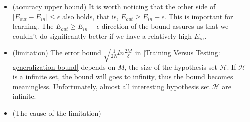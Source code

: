 \begin{itemize}[noitemsep, topsep=0pt]
    \item (accuracy upper bound) It is worth noticing that the other side of $|E_{out} - E_{in}| \le \epsilon$ also holds,
        that is, $E_{out} \ge E_{in} - \epsilon$.
        This is important for learning. 
        The $E_{out} \ge E_{in} - \epsilon$ direction of the bound assures us that we couldn't do significantly better
        if we have a relatively high $E_{in}$.
    \item (limitation) The error bound $\sqrt{\frac{1}{2N} ln \frac{2M}{\delta}}$ in \ref{Training Versus Testing: generalization bound}
        depends on $M$, the size of the hypothesis set $\mathcal{H}$. 
        If $\mathcal{H}$ is a infinite set,
        the bound will goes to infinity,
        thus the bound becomes meaningless.
        Unfortunately, almost all interesting hypothesis set $\mathcal{H}$ are infinite.
    \item (The cause of the limitation)
\end{itemize}









